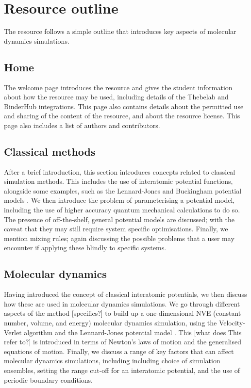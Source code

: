 \documentclass[amsmath,amssymb,twocolumn,superscriptaddress]{revtex4-1}
\begin{document}
\section{Resource outline}

The resource follows a simple outline that introduces key aspects of molecular dynamics simulations.

\subsection{Home}

The welcome page introduces the resource and gives the student information about how the resource may be used, including details of the Thebelab and BinderHub integrations.
This page also contains details about the permitted use and sharing of the content of the resource, and about the resource license.
This page also includes a list of authors and contributors.

\subsection{Classical methods}

After a brief introduction, this section introduces concepts related to classical simulation methods.
This includes the use of interatomic potential functions, alongside some examples, such as the Lennard-Jones and Buckingham potential models \cite{lennard-jones_determination_1924,buckingham_classical_1938}.
We then introduce the problem of parameterising a potential model, including the use of higher accuracy quantum mechanical calculations to do so.
The presence of off-the-shelf, general potential models are discussed; with the caveat that they may still require system specific optimisations.
Finally, we mention mixing rules; again discussing the possible problems that a user may encounter if applying these blindly to specific systems.

\subsection{Molecular dynamics}

Having introduced the concept of classical interatomic potentials, we then discuss how these are used in  molecular dynamics simulations.
We go through different aspects of the method [specifics?] to build up a one-dimensional NVE (constant number, volume, and energy) molecular dynamics simulation, using the Velocity-Verlet algorithm and the Lennard-Jones potential model \cite{swope_computer_1982,lennard-jones_determination_1924}.
This [what does This refer to?] is introduced in terms of Newton's laws of motion and the generalised equations of motion.
Finally, we discuss a range of key factors that can affect molecular dynamics simulations, including including choice of simulation ensembles, setting the range cut-off for an interatomic potential, and the use of periodic boundary conditions.
\end{document}
